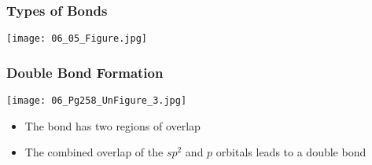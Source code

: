 \documentclass[notes=only]{beamer}
\begin{document}
\begin{frame}[c]
	\frametitle{Types of Bonds}

%

	\texttt{[image: 06\_05\_Figure.jpg]}
\end{frame}

	
\begin{frame}
	\frametitle{Double Bond Formation}

	\begin{center}
		\texttt{[image: 06\_Pg258\_UnFigure\_3.jpg]}
	\end{center}

	\begin{itemize}
		\item The \textpi{} bond has \alert{two} regions of overlap
		\item The combined overlap of the $sp^2$ and $p$
			orbitals leads to a \alert{double bond}
	\end{itemize}
\end{frame}
\end{document}
